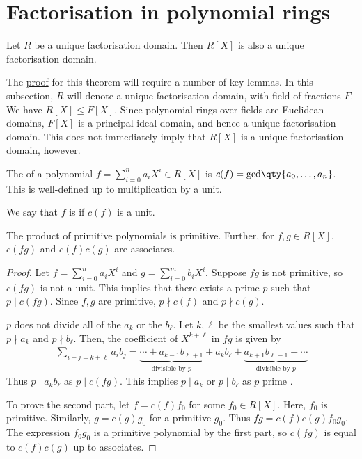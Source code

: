\section{Factorisation in polynomial rings}
\begin{theorem} \label{thm:11.1}
	Let $R$ be a unique factorisation domain.
	Then $R[X]$ is also a unique factorisation domain.
\end{theorem}
The \hyperref[prf:11.1]{proof} for this theorem will require a number of key lemmas.
In this subsection, $R$ will denote a unique factorisation domain, with field of fractions $F$.
We have $R[X] \leq F[X]$.
Since polynomial rings over fields are Euclidean domains, $F[X]$ is a principal ideal domain, and hence a unique factorisation domain.
This does not immediately imply that $R[X]$ is a unique factorisation domain, however.

\begin{definition}[Content]
	The  of a polynomial $f = \sum_{i=0}^n a_i X^i \in R[X]$ is $c(f) = \mathrm{gcd}\qty{a_0, \dots, a_n}$.
	This is well-defined up to multiplication by a unit.
\end{definition}

\begin{definition}[Primitive]
	We say that $f$ is  if $c(f)$ is a unit.
\end{definition} 

\begin{lemma} \label{lem:11.2}
	The product of primitive polynomials is primitive.
	Further, for $f, g \in R[X]$, $c(fg)$ and $c(f)c(g)$ are associates.
\end{lemma}

\begin{proof}
	Let $f = \sum_{i=0}^n a_i X^i$ and $g = \sum_{i=0}^m b_i X^i$.
	Suppose $fg$ is not primitive, so $c(fg)$ is not a unit.
	This implies that there exists a prime $p$ such that $p \mid c(fg)$.
	Since $f, g$ are primitive, $p \nmid c(f)$ and $p \nmid c(g)$.

	$p$ does not divide all of the $a_k$ or the $b_\ell$.
	Let $k, \ell$ be the smallest values such that $p \nmid a_k$ and $p \nmid b_\ell$.
	Then, the coefficient of $X^{k+\ell}$ in $fg$ is given by
	\begin{align*}
		\sum_{i+j=k+\ell} a_i b_j = \underbrace{\cdots + a_{k-1} b_{\ell+1}}_{\text{divisible by } p} + a_k b_\ell + \underbrace{a_{k+1} b_{\ell - 1} + \cdots}_{\text{divisible by } p}
	\end{align*}
	Thus $p \mid a_k b_\ell$ as $p \mid c(fg)$.
	This implies $p \mid a_k$ or $p \mid b_\ell$ as $p$ prime \Lightning.

	To prove the second part, let $f = c(f) f_0$ for some $f_0 \in R[X]$.
	Here, $f_0$ is primitive.
	Similarly, $g = c(g) g_0$ for a primitive $g_0$.
	Thus $fg = c(f) c(g) f_0 g_0$.
	The expression $f_0 g_0$ is a primitive polynomial by the first part, so $c(fg)$ is equal to $c(f) c(g)$ up to associates.
\end{proof}

